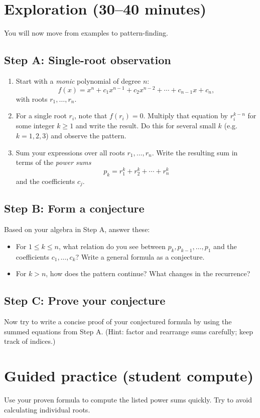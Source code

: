 \documentclass{tufte-handout}
\begin{document}
\section*{Exploration (30--40 minutes)}
You will now move from examples to pattern-finding.

\subsection*{Step A: Single-root observation}
\begin{enumerate}[label=\textbf{A\arabic*.}, leftmargin=*, nosep]
  \item Start with a \emph{monic} polynomial of degree \(n\):
  \[
    f(x)=x^n+c_1x^{n-1}+c_2x^{n-2}+\cdots+c_{n-1}x+c_n,
  \]
  with roots \(r_1,\dots,r_n\).
  \item For a single root \(r_i\), note that \(f(r_i)=0\). Multiply that equation by \(r_i^{k-n}\) for some integer \(k\ge 1\) and write the result. Do this for several small \(k\) (e.g. \(k=1,2,3\)) and observe the pattern.
  \item Sum your expressions over all roots \(r_1,\dots,r_n\). Write the resulting sum in terms of the \emph{power sums}
  \[
    p_k = r_1^k + r_2^k + \cdots + r_n^k
  \]
  and the coefficients \(c_j\).
\end{enumerate}

\subsection*{Step B: Form a conjecture}
Based on your algebra in Step A, answer these:
\begin{itemize}
  \item For \(1\le k\le n\), what relation do you see between \(p_k, p_{k-1},\dots,p_1\) and the coefficients \(c_1,\dots,c_k\)? Write a general formula as a conjecture.
  \item For \(k>n\), how does the pattern continue? What changes in the recurrence?
\end{itemize}

\subsection*{Step C: Prove your conjecture}
Now try to write a concise proof of your conjectured formula by using the summed equations from Step A. (Hint: factor and rearrange sums carefully; keep track of indices.)

\section*{Guided practice (student compute)}
Use your proven formula to compute the listed power sums quickly. Try to avoid calculating individual roots.
\end{document}
